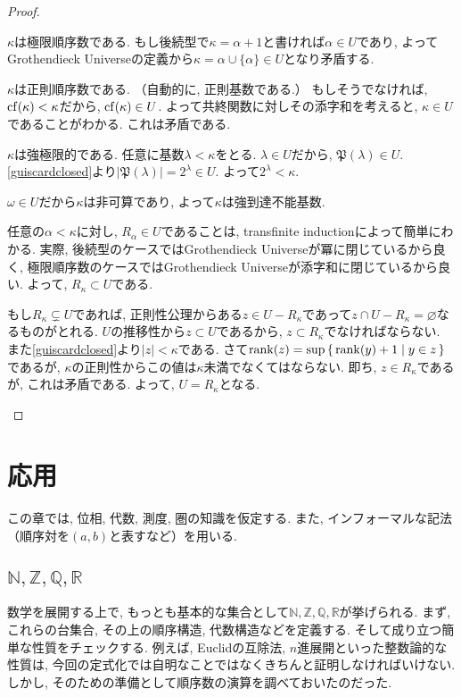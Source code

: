 \documentclass[a4paper, twoside]{bxjsarticle}
\newcommand{\nat}{\mathbb{N}}
\newcommand{\zah}{\mathbb{Z}}
\newcommand{\quo}{\mathbb{Q}}
\newcommand{\rea}{\mathbb{R}}
\newcommand{\abs}[1]{\left\lvert#1\right\rvert}
\theoremstyle{definition}
\begin{document}
\begin{proof}
\begin{framed}
                $\kappa$は極限順序数である. もし後続型で$\kappa=\alpha+1$と書ければ$\alpha\in U$であり, よってGrothendieck Universeの定義から$\kappa=\alpha\cup\{\alpha\}\in U$となり矛盾する.
                
                $\kappa$は正則順序数である. （自動的に, 正則基数である.） もしそうでなければ, ${\rm cf}(\kappa)<\kappa$だから, ${\rm cf}(\kappa)\in U$. よって共終関数に対しその添字和を考えると, $\kappa\in U$であることがわかる. これは矛盾である.
                
                $\kappa$は強極限的である. 任意に基数$\lambda<\kappa$をとる. $\lambda\in U$だから, $\mathfrak{P}(\lambda)\in U$. \ref{guiscardclosed}より$\abs{\mathfrak{P}(\lambda)}=2^\lambda\in U$. よって$2^\lambda<\kappa$.
                
                $\omega\in U$だから$\kappa$は非可算であり, よって$\kappa$は強到達不能基数.
                
                任意の$\alpha<\kappa$に対し, $R_\alpha\in U$であることは, transfinite inductionによって簡単にわかる. 実際, 後続型のケースではGrothendieck Universeが冪に閉じているから良く, 極限順序数のケースではGrothendieck Universeが添字和に閉じているから良い. よって, $R_\kappa\subset U$である.
                
                もし$R_\kappa\subsetneq U$であれば, 正則性公理からある$z\in U-R_\kappa$であって$z\cap U-R_\kappa = \varnothing$なるものがとれる. $U$の推移性から$z\subset U$であるから, $z\subset R_\kappa$でなければならない. また\ref{guiscardclosed}より$\abs{z}<\kappa$である. さて${\rm rank}(z)={\rm sup}\set{{\rm rank}(y)+1|y\in z}$であるが, $\kappa$の正則性からこの値は$\kappa$未満でなくてはならない. 即ち, $z\in R_\kappa$であるが, これは矛盾である. よって, $U=R_\kappa$となる.
            \end{framed}
        \end{proof}
        \cleardoublepage
    
    \section{応用}
    この章では, 位相, 代数, 測度, 圏の知識を仮定する. また, インフォーマルな記法（順序対を$(a, b)$と表すなど）を用いる.
    \subsection{$\nat, \zah, \quo, \rea$}
        数学を展開する上で, もっとも基本的な集合として$\nat, \zah, \quo, \rea$が挙げられる. まず, これらの台集合, その上の順序構造, 代数構造などを定義する. そして成り立つ簡単な性質をチェックする. 例えば, Euclidの互除法, $n$進展開といった整数論的な性質は, 今回の定式化では自明なことではなくきちんと証明しなければいけない. しかし, そのための準備として順序数の演算を調べておいたのだった.
        
\end{document}
